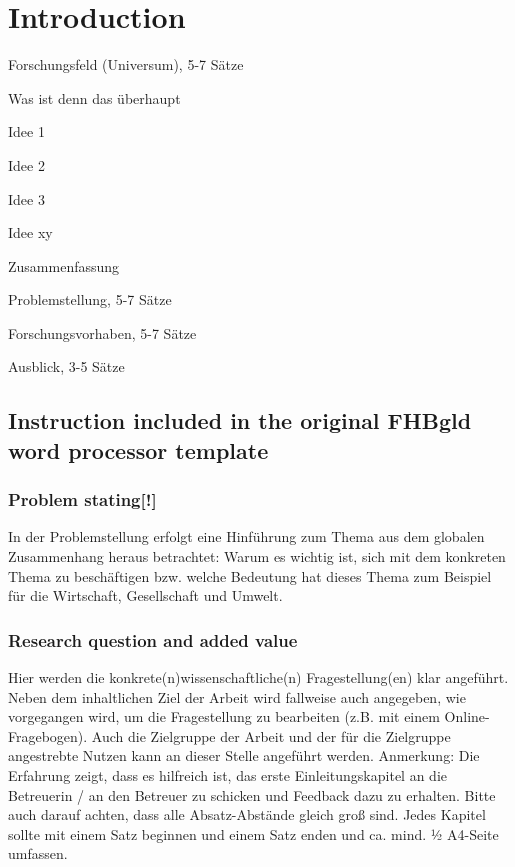 
\chapter{Introduction}


Forschungsfeld (Universum), 5-7 Sätze

Was ist denn das überhaupt

Idee 1

Idee 2

Idee 3

Idee xy

Zusammenfassung

Problemstellung, 5-7 Sätze

Forschungsvorhaben, 5-7 Sätze

Ausblick, 3-5 Sätze

\section{Instruction included in the original FHBgld word processor template}
\subsection{Problem stating[!]}
In der Problemstellung erfolgt eine Hinführung zum Thema aus dem globalen
Zusammenhang heraus betrachtet: Warum es wichtig ist, sich mit dem konkreten
Thema zu beschäftigen bzw. welche Bedeutung hat dieses Thema zum Beispiel für die
Wirtschaft, Gesellschaft und Umwelt.
\subsection{Research question and added value}
Hier werden die konkrete(n)wissenschaftliche(n) Fragestellung(en) klar angeführt.
Neben dem inhaltlichen Ziel der Arbeit wird fallweise auch angegeben, wie
vorgegangen wird, um die Fragestellung zu bearbeiten (z.B. mit einem Online-
Fragebogen). Auch die Zielgruppe der Arbeit und der für die Zielgruppe angestrebte
Nutzen kann an dieser Stelle angeführt werden.
Anmerkung:
Die Erfahrung zeigt, dass es hilfreich ist, das erste Einleitungskapitel an die Betreuerin
/ an den Betreuer zu schicken und Feedback dazu zu erhalten.
Bitte auch darauf achten, dass alle Absatz-Abstände gleich groß sind.
Jedes Kapitel sollte mit einem Satz beginnen und einem Satz enden und ca. mind. 1⁄2
A4-Seite umfassen.

